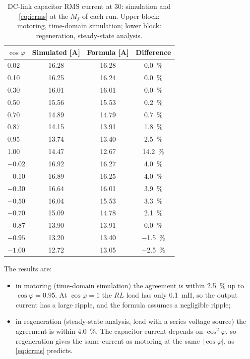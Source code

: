 \begin{table}[H]
\centering
\caption{DC-link capacitor RMS current at \SI{30}{\Arms}: simulation and
\cref{eq:icrms} at the $M_f$ of each run. Upper block: motoring, time-domain
simulation; lower block: regeneration, steady-state analysis.}
\label{tab:ic-check}
\zebra
\begin{tabular}{lccc}
\toprule
$\cos\varphi$ & Simulated [\si{\ampere}] & Formula [\si{\ampere}] & Difference \\
\midrule
0.02 & 16.28 & 16.28 & \SI{0.0}{\percent} \\
0.10 & 16.25 & 16.24 & \SI{0.0}{\percent} \\
0.30 & 16.01 & 16.01 & \SI{0.0}{\percent} \\
0.50 & 15.56 & 15.53 & \SI{+0.2}{\percent} \\
0.70 & 14.89 & 14.79 & \SI{+0.7}{\percent} \\
0.87 & 14.15 & 13.91 & \SI{+1.8}{\percent} \\
0.95 & 13.74 & 13.40 & \SI{+2.5}{\percent} \\
1.00 & 14.47 & 12.67 & \SI{+14.2}{\percent} \\
\midrule
$-0.02$ & 16.92 & 16.27 & \SI{+4.0}{\percent} \\
$-0.10$ & 16.89 & 16.25 & \SI{+4.0}{\percent} \\
$-0.30$ & 16.64 & 16.01 & \SI{+3.9}{\percent} \\
$-0.50$ & 16.04 & 15.53 & \SI{+3.3}{\percent} \\
$-0.70$ & 15.09 & 14.78 & \SI{+2.1}{\percent} \\
$-0.87$ & 13.90 & 13.91 & \SI{0.0}{\percent} \\
$-0.95$ & 13.20 & 13.40 & \SI{-1.5}{\percent} \\
$-1.00$ & 12.72 & 13.05 & \SI{-2.5}{\percent} \\
\bottomrule
\end{tabular}
\end{table}

The results are:
\begin{itemize}
  \item in motoring (time-domain simulation) the agreement is within
        \SI{2.5}{\percent} up to $\cos\varphi = 0.95$. At $\cos\varphi = 1$ the $RL$
        load has only \SI{0.1}{\milli\henry}, so the output current has a large
        ripple, and the formula assumes a negligible ripple;
  \item in regeneration (steady-state analysis, load with a series voltage
        source) the agreement is within \SI{4.0}{\percent}. The capacitor current
        depends on $\cos^2\varphi$, so regeneration gives the same current as
        motoring at the same $|\cos\varphi|$, as \cref{eq:icrms} predicts.
\end{itemize}

